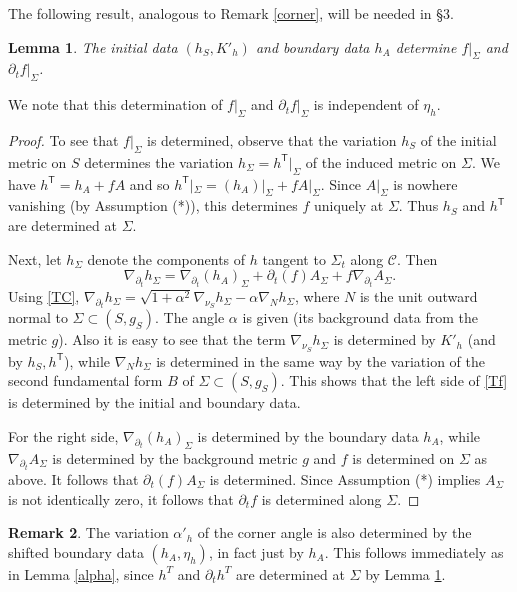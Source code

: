 \documentclass[10pt]{amsart}
\renewcommand{\a}{\alpha}
\newcommand{\Si}{\Sigma}
\newcommand{\cC}{{\mathcal C}}
\newcommand{\tT}{\mathsf{T}}
\newcommand{\be}{\begin{equation}}
\newcommand{\ee}{\end{equation}}
\newcommand{\p}{\partial}
\newcommand{\<}{\langle}
\renewcommand{\>}{\rangle}
\theoremstyle{plain}
\newtheorem{lemma}{Lemma}[section]
\theoremstyle{remark}
\theoremstyle{definition}
\newtheorem{remark}[lemma]{Remark}
\numberwithin{equation}{section}
\begin{document}
\medskip 

   The following result, analogous to Remark \ref{corner}, will be needed in \S 3. 
    
 \begin{lemma} \label{fft}
The initial data $(h_S, K'_h)$ and boundary data $h_A$ determine $f|_{\Si}$ and $\p_t f|_{\Si}$.
\end{lemma}
We note that this determination of $f|_{\Si}$ and $\p_t f|_{\Si}$ is independent of $\eta_h$. 
\begin{proof} 
To see that $f |_{\Si}$ is determined, observe that the variation $h_S$ of the initial metric on $S$ determines the variation $h_{\Si} = h^{\tT} |_{\Si}$ 
of the induced metric on $\Si$. We have $h^{\tT} = h_A + fA$ and so $h^{\tT} |_{\Si} = (h_A)|_{\Si} + fA|_{\Si}$. Since $A|_{\Si}$ is nowhere 
vanishing (by Assumption (*)), this determines $f$ uniquely at $\Si$. Thus $h_{S}$ and $h^{\tT}$ are determined at $\Si$. 

  Next, let $h_{\Si}$ denote the components of $h$ tangent to $\Si_t$ along $\cC$. Then 
\be \label{Tf}
\nabla_{\p_t} h_{\Si} = \nabla_{\p_t} (h_A)_{\Si} + \p_t(f) A_{\Si} + f\nabla_{\p_t} A_{\Si}.
\ee
Using \eqref{TC}, $\nabla_{\p_t} h_{\Si} = \sqrt{1+\a^2}\nabla_{\nu_S} h_{\Si} - \a \nabla_{N} h_{\Si}$, where $N$ is the unit outward normal to $\Si \subset 
(S, g_S)$. The angle $\a$ is given (its background data from the metric $g$). Also it is easy to see that the term $\nabla_{\nu_S} h_{\Si}$ is determined by 
$K'_h$ (and by $h_S, h^{\tT}$), while $\nabla_N h_{\Si}$ is determined in the same way by the variation of the second fundamental form $B$ of 
$\Si \subset (S, g_S)$. This shows that the left side of \eqref{Tf} is determined by the initial and boundary data.  

  For the right side, $\nabla_{\p_t}(h_A)_{\Si}$ is determined by the boundary data $h_A$, while $\nabla_{\p_t} A_{\Si}$ is determined by the 
background metric $g$ and $f$ is determined on $\Si$ as above. It follows that $\p_t(f)A_{\Si}$ is determined. Since Assumption (*) implies 
$A_{\Si}$ is not identically zero, it follows that $\p_t f$ is determined along $\Si$.  
 
\end{proof} 
 

\begin{remark} \label{angvar} 
{\rm The variation $\a'_h$ of the corner angle is also determined by the shifted boundary data $(h_A, \eta_h)$, in fact just by $h_A$. This follows 
immediately as in Lemma \ref{alpha}, since $h^T$ and $\p_t h^T$ are determined at $\Si$ by Lemma \ref{fft}.  
}
\end{remark}
\end{document}
